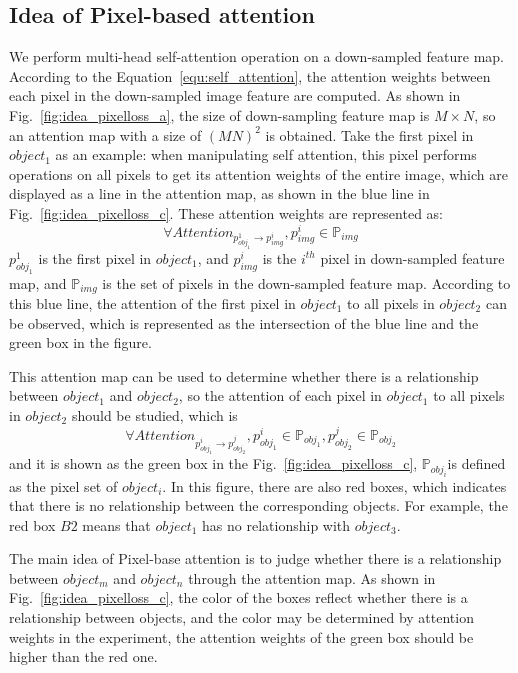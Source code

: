 \subsection{Idea of Pixel-based attention}
\label{sec:pixelbaseatt}
We perform multi-head self-attention operation on a down-sampled feature map. According to the Equation~\ref{equ:self_attention},  the attention weights between each pixel in the down-sampled image feature are computed. As shown in Fig.~\ref{fig:idea_pixelloss_a}, the size of down-sampling feature map is $  M\times N $, so an attention map with a size of $ (MN)^2 $ is obtained. Take the first pixel in $ object_1 $ as an example: when manipulating self attention, this pixel performs operations on all pixels to get its attention weights of the entire image, which are displayed as a line in the attention map, as shown in the blue line in Fig.~\ref{fig:idea_pixelloss_c}. These attention weights are represented as:
$$ \forall Attention_{p^1_{obj_1} \to p^i_{img}} , p^i_{img} \in \mathbb{P}_{img} $$ $ p^1_{obj_1} $ is the first pixel in $ object_1 $, and $ p^i_{img} $ is the $ i^{th} $ pixel in down-sampled feature map, and $ \mathbb{P}_{img} $ is the set of pixels in the down-sampled feature map. According to this blue line, the attention of the first pixel in $ object_1 $ to all pixels in $ object_2 $ can be observed, which is represented as the intersection of the blue line and the green box in the figure.

This attention map can be used to determine whether there is a relationship between $ object_1 $ and $ object_2 $, so the attention of each pixel in $ object_1 $ to all pixels in $ object_2 $ should be studied, which is $$ \forall Attention_{p^i_{obj_1} \to p^j_{obj_2}} , p^i_{obj_1} \in \mathbb{P}_{obj_1}, p^j_{obj_2} \in \mathbb{P}_{obj_2}  $$ and it is shown as the green box in the Fig.~\ref{fig:idea_pixelloss_c}, $ \mathbb{P}_{obj_i} $is defined as the pixel set of $ object_i $. In this figure, there are also red boxes, which indicates that there is no relationship between the corresponding objects. For example, the red box $ B2 $ means that $ object_1 $ has no relationship with $ object_3 $.

The main idea of Pixel-base attention is to judge whether there is a relationship between $ object_m $ and $ object_n $ through the attention map. As shown in Fig.~\ref{fig:idea_pixelloss_c}, the color of the boxes reflect whether there is a relationship between objects, and the color may be determined by attention weights in the experiment, the attention weights of the green box should be higher than the red one.

